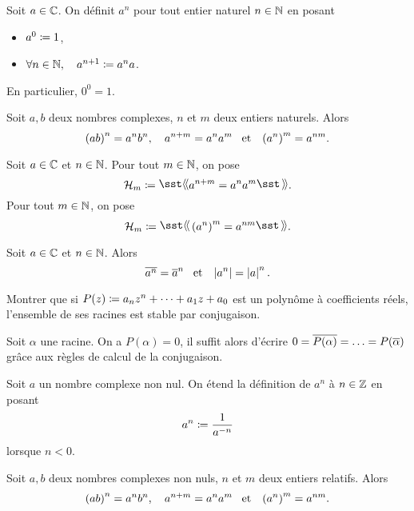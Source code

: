 \documentclass{magnoliaold}
\begin{document}
\begin{definition}[utile=-3]
  Soit $a\in\mathbb{C}$. On définit $a^n$ pour tout entier naturel $n\in\mathbb{N}$ en posant
  \begin{itemize}
    \item $a^0\coloneqq 1$,
    \item $\forall n\in\mathbb{N} ,\quad a^{n+1}\coloneqq a^n a$.
  \end{itemize}
\end{definition}

\begin{remarqueUnique}
\remarque En particulier, $0^0=1$.
\end{remarqueUnique}

\begin{proposition}[utile=-3]
  Soit $a,b$ deux nombres complexes, $n$ et $m$ deux entiers
  naturels. Alors
  \[\left(ab\right)^n=a^n b^n, \quad a^{n+m}=a^n a^m \quad\!\text{et}\quad\! 
    \left(a^n\right)^m=a^{nm}.\]
\end{proposition}

\begin{preuve}
Soit $a\in\mathbb{C}$ et $n\in\mathbb{N}$. Pour tout $m\in\mathbb{N}$, on pose
\[\mathcal{H}_m\defeq\mog a^{n+m}=a^n a^m\mfg.\]
Pour tout $m\in\mathbb{N}$, on pose
\[\mathcal{H}_m\defeq\mog \p{a^n}^m=a^{nm}\mfg.\]
\end{preuve}

\begin{proposition}[utile=-3]
  Soit $a\in\mathbb{C}$ et $n\in\mathbb{N}$. Alors
  \[\overline{a^n}=\overline{a}^n \quad\!\text{et}\quad\! \left|a^n\right|=\left|a\right|^n.\]
\end{proposition}

\begin{exoUnique}
\exo Montrer que si $P(z)\coloneqq a_n z^n+\cdots+a_1 z+a_0$ est un polynôme à coefficients réels, l'ensemble de ses racines est stable par conjugaison.
\end{exoUnique}

\begin{sol}
Soit $\alpha$ une racine. On a $P(\alpha)=0$, il suffit alors d'écrire $0=\overline{P(\alpha)}=\ldots=P(\overline{\alpha})$ grâce aux règles de calcul de la conjugaison.
\end{sol}

\begin{definition}
  Soit $a$ un nombre complexe non nul. On étend la définition de
  $a^n$ à $n\in\mathbb{Z}$ en posant
  $$a^n\coloneqq \frac{1}{a^{-n}}$$
  lorsque $n<0$.
\end{definition}

\begin{proposition}
Soit $a,b$ deux nombres complexes non nuls, $n$ et $m$ deux entiers
relatifs. Alors
\[\left(ab\right)^n=a^n b^n,\quad
  a^{n+m}=a^n a^m \quad\!\text{et}\quad\!
  \left(a^n\right)^m=a^{nm}.\]
\end{proposition}
\end{document}
